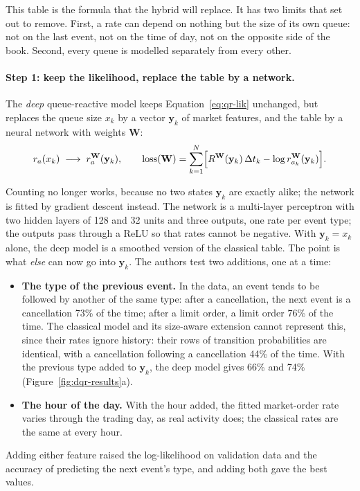 This table is the formula that the hybrid will replace. It has two limits that \citet{deepqr} set out to
remove. First, a rate can depend on nothing but the size of its own queue: not on the last event, not on the
time of day, not on the opposite side of the book. Second, every queue is modelled separately from every other.

\paragraph{Step 1: keep the likelihood, replace the table by a network.} The \emph{deep} queue-reactive model
keeps Equation~\eqref{eq:qr-lik} unchanged, but replaces the queue size $x_k$ by a vector $\mathbf{y}_k$ of
market features, and the table by a neural network with weights $\mathbf{W}$:
\begin{equation}
r_a(x_k) \;\longrightarrow\; r_a^{\mathbf{W}}(\mathbf{y}_k),
\qquad
\text{loss}(\mathbf{W}) = \sum_{k=1}^{N}\Bigl[R^{\mathbf{W}}(\mathbf{y}_k)\,\Delta t_k
- \log r^{\mathbf{W}}_{a_k}(\mathbf{y}_k)\Bigr].
\label{eq:dqr-loss}
\end{equation}

Counting no longer works, because no two states $\mathbf{y}_k$ are exactly alike; the network is fitted by
gradient descent instead. The network is a multi-layer perceptron with two hidden layers of 128 and 32 units
and three outputs, one rate per event type; the outputs pass through a ReLU so that rates cannot be negative.
With $\mathbf{y}_k=x_k$ alone, the deep model is a smoothed version of the classical table. The point is what
\emph{else} can now go into $\mathbf{y}_k$. The authors test two additions, one at a time:
\begin{itemize}[leftmargin=1.5em,itemsep=1pt]
\item \textbf{The type of the previous event.} In the data, an event tends to be followed by another of the same
  type: after a cancellation, the next event is a cancellation 73\% of the time; after a limit order, a limit
  order 76\% of the time. The classical model and its size-aware extension cannot represent this, since their
  rates ignore history: their rows of transition probabilities are identical, with a cancellation following a
  cancellation 44\% of the time. With the previous type added to $\mathbf{y}_k$, the deep model gives 66\% and
  74\% (Figure~\ref{fig:dqr-results}a).
\item \textbf{The hour of the day.} With the hour added, the fitted market-order rate varies through the
  trading day, as real activity does; the classical rates are the same at every hour.
\end{itemize}
Adding either feature raised the log-likelihood on validation data and the accuracy of predicting the next
event's type, and adding both gave the best values.

